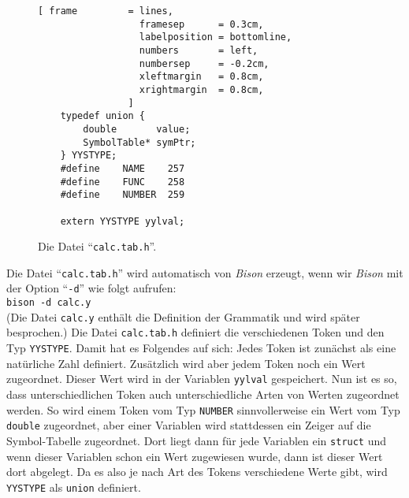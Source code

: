 \begin{figure}[!ht]
\centering
\begin{Verbatim}[ frame         = lines, 
                  framesep      = 0.3cm, 
                  labelposition = bottomline,
                  numbers       = left,
                  numbersep     = -0.2cm,
                  xleftmargin   = 0.8cm,
                  xrightmargin  = 0.8cm,
                ]
    typedef union {
        double       value;
        SymbolTable* symPtr;
    } YYSTYPE;
    #define    NAME    257
    #define    FUNC    258
    #define    NUMBER  259
    
    extern YYSTYPE yylval;
\end{Verbatim}
\vspace*{-0.3cm}
\caption{Die Datei ``\texttt{calc.tab.h}''.}
\label{fig:calc.tab.h}
\end{figure}
Die Datei ``\texttt{calc.tab.h}'' wird automatisch von \textsl{Bison} erzeugt,
wenn wir \textsl{Bison} mit der Option ``\texttt{-d}'' wie folgt aufrufen:
\\[0.2cm]
\hspace*{1.3cm}
\texttt{bison -d calc.y}
\\[0.2cm]
(Die Datei \texttt{calc.y} enth\"alt die Definition der Grammatik und wird sp\"ater besprochen.)
Die Datei \texttt{calc.tab.h} definiert die verschiedenen Token und den Typ
\texttt{YYSTYPE}.  Damit hat es Folgendes auf sich: Jedes Token ist zun\"achst als eine
nat\"urliche Zahl definiert.  Zus\"atzlich wird aber jedem Token noch ein Wert zugeordnet.
Dieser Wert wird in der Variablen \texttt{yylval} gespeichert.  Nun ist es so, dass
unterschiedlichen Token auch unterschiedliche Arten von Werten zugeordnet werden.  So wird
einem Token vom Typ \texttt{NUMBER} sinnvollerweise ein Wert vom Typ \texttt{double}
zugeordnet, aber einer Variablen wird stattdessen ein Zeiger auf die Symbol-Tabelle
zugeordnet.  Dort liegt dann f\"ur jede Variablen ein \texttt{struct} und wenn dieser
Variablen schon ein Wert zugewiesen wurde, dann ist dieser Wert dort abgelegt.  Da es also
je nach Art des Tokens verschiedene Werte gibt, wird \texttt{YYSTYPE} als \texttt{union}
definiert.

